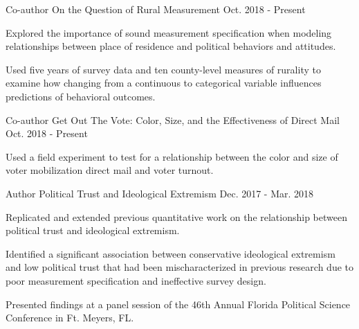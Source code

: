 \begin{cventries}
    \cventry
      {Co-author} %
      {On the Question of Rural Measurement} %
      {Oct. 2018 - Present} %
      {} %
      {
        \begin{cvitems} %
          \item {Explored the importance of sound measurement specification when modeling relationships between place of residence and political behaviors and attitudes.}
          \item {Used five years of survey data and ten county-level measures of rurality to examine how changing from a continuous to categorical variable influences predictions of behavioral outcomes.}
        \end{cvitems}
      }

    \cventry
      {Co-author} %
      {Get Out The Vote: Color, Size, and the Effectiveness of Direct Mail} %
      {Oct. 2018 - Present} %
      {} %
      {
        \begin{cvitems} %
          \item {Used a field experiment to test for a relationship between the color and size of voter mobilization direct mail and voter turnout.}
        \end{cvitems}
      }


    \cventry
      {Author} %
      {Political Trust and Ideological Extremism} %
      {Dec. 2017 - Mar. 2018} %
      {} %
      {
        \begin{cvitems} %
          \item {Replicated and extended previous quantitative work on the relationship between political trust and ideological extremism.}
          \item {Identified a significant association between conservative ideological extremism and low political trust that had been mischaracterized in previous research due to poor measurement specification and ineffective survey design.}
          \item {Presented findings at a panel session of the 46th Annual Florida Political Science Conference in Ft. Meyers, FL.}
        \end{cvitems}
      }



\end{cventries}
